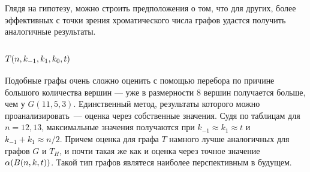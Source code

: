 Глядя на гипотезу, можно строить предположения о том, что для других, более
эффективных с точки зрения хроматического числа графов удастся получить
аналогичные результаты.

\subsection{$T(n,k_{-1},k_1,k_0,t)$}

Подобные графы очень сложно оценить с помощью перебора по причине большого
количества вершин --- уже в размерности 8 вершин получается больше, чем у
$G(11, 5 ,3)$. Единственный метод, результаты которого можно
проанализировать~--- оценка через собственные значения.
Судя по таблицам для $n=12,13$, максимальные значения получаются при
$k_{-1} \approx k_1 \approx t$ и $k_{-1} + k_1 \approx n/2$.
Причем оценка для графа $T$ намного лучше аналогичных для графов $G$ и $T_H$,
и почти такая же как и оценка через точное значение $\alpha(B(n,k,t))$.
Такой тип графов являтеся наиболее перспективным в будущем.
